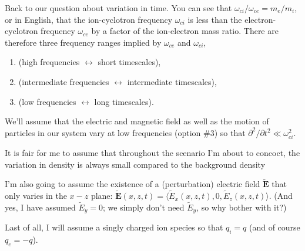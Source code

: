 Back to our question about variation in time. You can see that
$\omega_{ci} / \omega_{ce} = m_e/m_i$, or in English, that the ion-cyclotron
frequency $\omega_{ci}$ is less than the electron-cyclotron frequency
$\omega_{ce}$ by a factor of the ion-electron mass ratio. There are therefore
three frequency ranges implied by $\omega_{ce}$ and $\omega_{ci}$, \par
\begin{enumerate}
\item {} (high frequencies $\leftrightarrow$ short timescales),
\item {} (intermediate frequencies $\leftrightarrow$ intermediate timescales),
\item {} (low frequencies $\leftrightarrow$ long timescales).
\end{enumerate}
We'll assume that the electric and magnetic field as well as the motion of
particles in our system vary at low frequencies (option \#3) so that
$\partial^2 / \partial t^2 \ll \omega_{ci}^2$.


It is fair for me to assume that throughout the scenario I'm about to concoct,
the variation in density is always small compared to the background density

I'm also going to assume the existence of a (perturbation) electric field
$\mathbf{\tilde E}$ that only varies in the $x-z$ plane:
$\mathbf{\tilde E} (x, z, t) = \langle \tilde E_x (x, z, t), 0, \tilde E_z (x,
z, t) \rangle$.
(And yes, I have assumed $\tilde E_y = 0$; we simply don't need $\tilde E_y$, so why bother
with it?)

Last of all, I will assume a singly charged ion species so that $q_i = q$ (and
of course $q_e = -q$).

